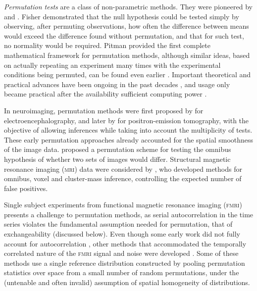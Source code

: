 \emph{Permutation tests} are a class of non-parametric methods. They were pioneered by \citet{Fisher1935} and \citet{Pitman1937-I, Pitman1937-II, Pitman1938}. Fisher demonstrated that the null hypothesis could be tested simply by observing, after permuting observations, how often the difference between means would exceed the difference found without permutation, and that for such test, no normality would be required. Pitman provided the first complete mathematical framework for permutation methods, although similar ideas, based on actually repeating an experiment many times with the experimental conditions being permuted, can be found even earlier \citep{Peirce1884}. Important theoretical and practical advances have been ongoing in the past decades \citep{Pearson1937, Scheffe1943, Lehmann1949, Kempthorne1955, Edgington1995, Good2002, Good2005, Westfall2008, Pesarin2010}, and usage only became practical after the availability sufficient computing power \citep{Efron1979}.

In neuroimaging, permutation methods were first proposed by \citet{Blair1994} for electroencephalography, and later by \citet{Holmes1996} for positron-emission tomography, with the objective of allowing inferences while taking into account the multiplicity of tests. These early permutation approaches already accounted for the spatial smoothness of the image data. \citet{Arndt1996} proposed a permutation scheme for testing the omnibus hypothesis of whether two sets of images would differ. Structural magnetic resonance imaging (\textsc{mri}) data were considered by \citet{Bullmore1999}, who developed methods for omnibus, voxel and cluster-mass inference, controlling the expected number of false positives.

Single subject experiments from functional magnetic resonance imaging (\textsc{fmri}) presents a challenge to permutation methods, as serial autocorrelation in the time series violates the fundamental assumption needed for permutation, that of exchangeability (discussed below). Even though some early work did not fully account for autocorrelation \citep{Belmonte2001}, other methods that accommodated the temporally correlated nature of the \textsc{fmri} signal and noise were developed \citep{Bullmore1996, Bullmore2001, Locascio1997, Brammer1997, Breakspear2004, Laird2004}. Some of these methods use a single reference distribution constructed by pooling permutation statistics over space from a small number of random permutations, under the (untenable and often invalid) assumption of spatial homogeneity of distributions.

